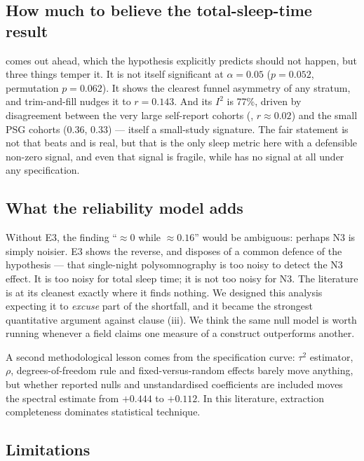 \subsection{How much to believe the total-sleep-time result}

\tst comes out ahead, which the hypothesis explicitly predicts should not happen, but three
things temper it. It is not itself significant at $\alpha = 0.05$ ($p = 0.052$, permutation
$p = 0.062$). It shows the clearest funnel asymmetry of any stratum, and trim-and-fill nudges it
to $r = 0.143$. And its $I^2$ is 77\%, driven by disagreement between the very large self-report
cohorts (\afour, $r \approx 0.02$) and the small PSG cohorts (\berkeley $0.36$, \blsa $0.33$) ---
itself a small-study signature. The fair statement is not that \tst beats \stage and is real, but
that \tst is the only sleep metric here with a defensible non-zero signal, and even that signal
is fragile, while \stage has no signal at all under any specification.

\subsection{What the reliability model adds}

Without E3, the finding ``\stage $\approx 0$ while \tst $\approx 0.16$'' would be ambiguous:
perhaps N3 is simply noisier. E3 shows the reverse, and disposes of a common defence of the
hypothesis --- that single-night polysomnography is too noisy to detect the N3 effect. It is too
noisy for total sleep time; it is not too noisy for N3. The literature is at its cleanest exactly
where it finds nothing. We designed this analysis expecting it to \emph{excuse} part of the
shortfall, and it became the strongest quantitative argument against clause (iii). We think the
same null model is worth running whenever a field claims one measure of a construct outperforms
another.

A second methodological lesson comes from the specification curve: $\tau^2$ estimator, $\rho$,
degrees-of-freedom rule and fixed-versus-random effects barely move anything, but whether
reported nulls and unstandardised coefficients are included moves the spectral estimate from
$+0.444$ to $+0.112$. In this literature, extraction completeness dominates statistical
technique.

\subsection{Limitations}

